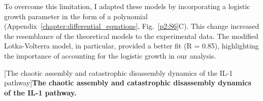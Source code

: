 To overcome this limitation, I adapted these models by incorporating a logistic growth parameter in the form of a polynomial (Appendix~\ref{chapter:differential_equations}, Fig.~\ref{p2:S6}C). This change increased the resemblance of the theoretical models to the experimental data. The modified Lotka-Volterra model, in particular, provided a better fit (R = 0.85), highlighting the importance of accounting for the logistic growth in our analysis.



\begin{centering}
\captionsetup{parbox=none}
[The chaotic assembly and catastrophic disassembly dynamics of the IL-1 pathway]{\textbf{The chaotic assembly and catastrophic disassembly dynamics of the IL-1 pathway.}
\vspace{1em}
\\
}
\end{centering}
